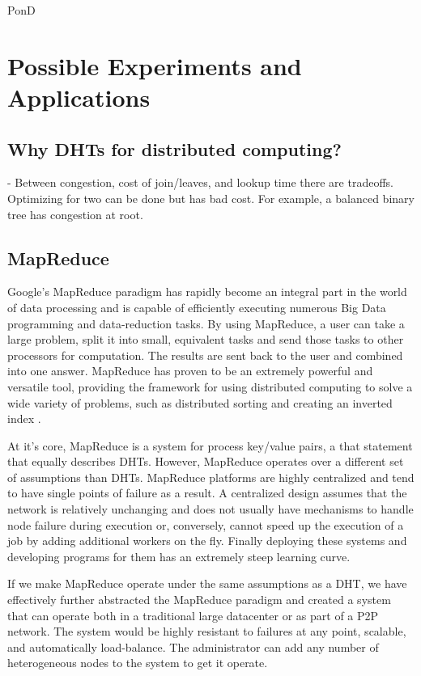 \documentclass[10pt,letterpaper,twoside]{report}
\begin{document}
PonD \cite{lee2012pond}



\chapter{Possible Experiments and Applications}

\section{Why DHTs for distributed computing?}

\cite{malkhi2001viceroy} -  Between congestion, cost of join/leaves, and lookup time there are tradeoffs.  
Optimizing for two can be done but has bad cost.
For example, a balanced binary tree has congestion at root.


\section{MapReduce}

Google's MapReduce \cite{mapreduce} paradigm has rapidly become an integral part in the world of data processing and is capable of efficiently executing numerous Big Data programming and data-reduction tasks.  
By using MapReduce, a user can take a large problem, split it into small, equivalent tasks and send those tasks to other processors for computation.  
The results are sent back to the user and combined into one answer.  
MapReduce has proven to be an extremely powerful and versatile tool, providing the framework for using distributed computing to solve a wide variety of problems, such as distributed sorting and creating an inverted index \cite{mapreduce}. 

At it's core, MapReduce \cite{mapreduce} is a system for process key/value pairs, a that statement that equally describes DHTs.
However, MapReduce operates over a different set of assumptions \cite{hadoopAssumptions} than DHTs.
MapReduce platforms are highly centralized and tend to have single points of failure\cite{shvachko2010hadoop} as a result.   
A centralized design assumes that the network is relatively unchanging and does not usually have mechanisms to handle node failure during execution or, conversely, cannot speed up the execution of a job by adding additional workers on the fly.
Finally deploying these systems and developing programs for them has an extremely steep learning curve.

If we make MapReduce operate under the same assumptions as a DHT, we have effectively further abstracted the MapReduce paradigm and created a system that can operate both in a traditional large datacenter or as part of a P2P network.
The system would be highly resistant to failures at any point, scalable, and automatically load-balance. 
The administrator can add any number of heterogeneous nodes to the system to get it operate.
\end{document}
